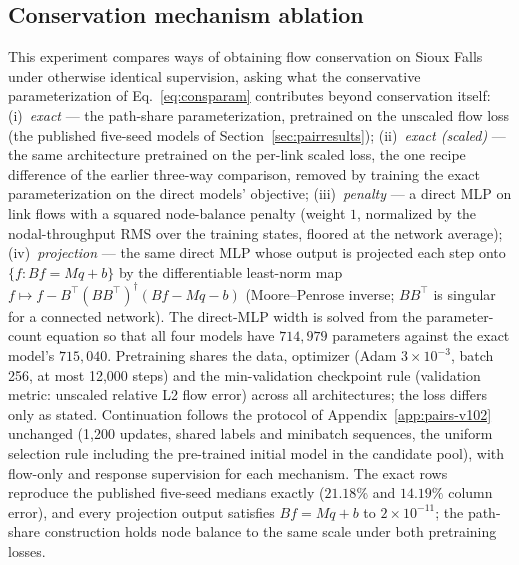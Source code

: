 \subsection{Conservation mechanism ablation}\label{app:conservation}
This experiment compares ways of obtaining flow conservation on
Sioux Falls under otherwise identical supervision, asking what the
conservative parameterization of Eq.~\eqref{eq:consparam} contributes
beyond conservation itself:
(i)~\emph{exact} --- the path-share parameterization, pretrained on the
unscaled flow loss (the published five-seed models of
Section~\ref{sec:pairresults});
(ii)~\emph{exact (scaled)} --- the same architecture pretrained on the
per-link scaled loss, the one recipe difference of the earlier
three-way comparison, removed by training the exact parameterization
on the direct models' objective;
(iii)~\emph{penalty} --- a direct MLP on link flows with a squared
node-balance penalty (weight $1$, normalized by the nodal-throughput
RMS over the training states, floored at the network average);
(iv)~\emph{projection} --- the same direct MLP whose output is
projected each step onto $\{f:Bf=Mq+b\}$ by the differentiable
least-norm map $f\mapsto f-B^{\!\top}(BB^{\!\top})^{\dagger}(Bf-Mq-b)$
(Moore--Penrose inverse; $BB^{\!\top}$ is singular for a connected
network). The direct-MLP width is solved from the parameter-count
equation so that all four models have $714{,}979$ parameters against
the exact model's $715{,}040$. Pretraining shares the data, optimizer
(Adam $3\times10^{-3}$, batch 256, at most 12{,}000 steps) and the
min-validation checkpoint rule (validation metric: unscaled relative
L2 flow error) across all architectures; the loss differs only as
stated. Continuation follows the protocol of
Appendix~\ref{app:pairs-v102} unchanged (1{,}200 updates, shared
labels and minibatch sequences, the uniform selection rule including
the pre-trained initial model in the candidate pool), with flow-only
and response supervision for each mechanism. The exact rows reproduce
the published five-seed medians exactly ($21.18\%$ and $14.19\%$
column error), and every projection output satisfies $Bf=Mq+b$ to
$2\times10^{-11}$; the path-share construction holds node balance to
the same scale under both pretraining losses.

